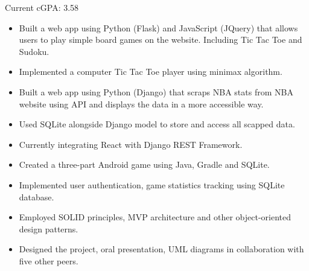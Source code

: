 


Current cGPA: 3.58

\vspace{10pt}




\vspace{5pt}

\begin{itemize}
	\item Built a web app using Python (Flask) and JavaScript (JQuery) that allows users to play simple board games on the website. Including Tic Tac Toe and Sudoku.
	\item Implemented a computer Tic Tac Toe player using minimax algorithm.
\end{itemize}

\divider


\vspace{5pt}

\begin{itemize}
	\item Built a web app using Python (Django) that scraps NBA stats from NBA website using API and displays the data in a more accessible way.
  \item Used SQLite alongside Django model to store and access all scapped data.
  \item Currently integrating React with Django REST Framework.
\end{itemize}

\divider


\vspace{5pt}

\begin{itemize}
	\item Created a three-part Android game using Java, Gradle and SQLite.
  \item Implemented user authentication, game statistics tracking using SQLite database.
  \item Employed SOLID principles, MVP architecture and other object-oriented design patterns.
	\item Designed the project, oral presentation, UML diagrams in collaboration with five other peers.
\end{itemize}

